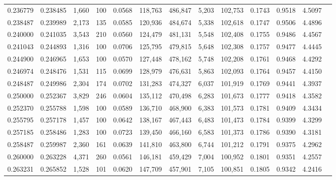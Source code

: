 \begin{tabular}{rrrrrrrrrrrrr}
0.236779 & 0.238485 & 1,660 & 100 &                                     0.0568 & 118,763 & 486,847 &   5,203 & 102,753 & 0.1743 & 0.9518 & 4.5097 \\
0.238487 & 0.239989 & 2,173 & 135 &                                     0.0585 & 120,936 & 484,674 &   5,338 & 102,618 & 0.1747 & 0.9506 & 4.4896 \\
0.240000 & 0.241035 & 3,543 & 210 &                                     0.0560 & 124,479 & 481,131 &   5,548 & 102,408 & 0.1755 & 0.9486 & 4.4567 \\
0.241043 & 0.244893 & 1,316 & 100 &                                     0.0706 & 125,795 & 479,815 &   5,648 & 102,308 & 0.1757 & 0.9477 & 4.4445 \\
0.244900 & 0.246965 & 1,653 & 100 &                                     0.0570 & 127,448 & 478,162 &   5,748 & 102,208 & 0.1761 & 0.9468 & 4.4292 \\
0.246974 & 0.248476 & 1,531 & 115 &                                     0.0699 & 128,979 & 476,631 &   5,863 & 102,093 & 0.1764 & 0.9457 & 4.4150 \\
0.248487 & 0.249986 & 2,304 & 174 &                                     0.0702 & 131,283 & 474,327 &   6,037 & 101,919 & 0.1769 & 0.9441 & 4.3937 \\
0.250000 & 0.252367 & 3,829 & 246 &                                     0.0604 & 135,112 & 470,498 &   6,283 & 101,673 & 0.1777 & 0.9418 & 4.3582 \\
0.252370 & 0.255788 & 1,598 & 100 &                                     0.0589 & 136,710 & 468,900 &   6,383 & 101,573 & 0.1781 & 0.9409 & 4.3434 \\
0.255795 & 0.257178 & 1,457 & 100 &                                     0.0642 & 138,167 & 467,443 &   6,483 & 101,473 & 0.1784 & 0.9399 & 4.3299 \\
0.257185 & 0.258486 & 1,283 & 100 &                                     0.0723 & 139,450 & 466,160 &   6,583 & 101,373 & 0.1786 & 0.9390 & 4.3181 \\
0.258487 & 0.259987 & 2,360 & 161 &                                     0.0639 & 141,810 & 463,800 &   6,744 & 101,212 & 0.1791 & 0.9375 & 4.2962 \\
0.260000 & 0.263228 & 4,371 & 260 &                                     0.0561 & 146,181 & 459,429 &   7,004 & 100,952 & 0.1801 & 0.9351 & 4.2557 \\
0.263231 & 0.265852 & 1,528 & 101 &                                     0.0620 & 147,709 & 457,901 &   7,105 & 100,851 & 0.1805 & 0.9342 & 4.2416 \\

\end{tabular}
